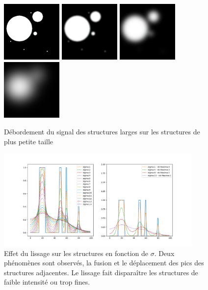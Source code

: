   \begin{figure}[!ht]
    \centering
    \includegraphics[height=3cm]{Images/gaussian_spilling_init.png}
    \includegraphics[height=3cm]{Images/gaussian_spilling_g10.png}
    \includegraphics[height=3cm]{Images/gaussian_spilling_g40.png}
    \includegraphics[height=3cm]{Images/gaussian_spilling_g100.png}
    \caption{Débordement du signal des structures larges sur les structures de plus petite taille}
    \label{fig:scale_space_spilling}
  \end{figure}
  
  \begin{figure}[h]
    \centering
    \includegraphics[height=5cm]{Images/GSP_experiment.png}
    \caption{Effet du lissage sur les structures en fonction de $\sigma$. Deux phénomènes sont observés, la fusion et le déplacement des pics des structures adjacentes. Le lissage fait disparaître les structures de faible intensité ou trop fines.}
    \label{fig:scale_space_spilling2}
  \end{figure}
  
